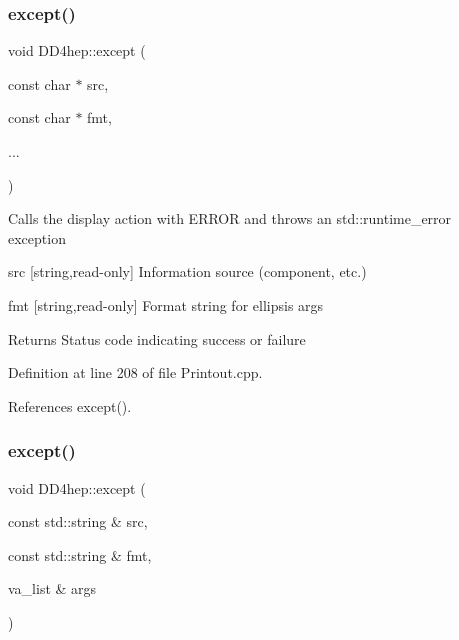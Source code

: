 \hypertarget{namespace_d_d4hep_a7fe7772a289c1e2eb3587ea99900827b}{}\label{namespace_d_d4hep_a7fe7772a289c1e2eb3587ea99900827b} 
\subsubsection{\texorpdfstring{except()}{except()}\hspace{0.1cm}{\footnotesize\ttfamily [2/4]}}
{\footnotesize\ttfamily void D\+D4hep\+::except (\begin{DoxyParamCaption}\item[{const char $\ast$}]{src,  }\item[{const char $\ast$}]{fmt,  }\item[{}]{... }\end{DoxyParamCaption})}

Calls the display action with E\+R\+R\+OR and throws an std\+::runtime\+\_\+error exception \begin{DoxyItemize}
\item src \mbox{[}string,read-\/only\mbox{]} Information source (component, etc.) \item fmt \mbox{[}string,read-\/only\mbox{]} Format string for ellipsis args \begin{DoxyReturn}{Returns}
Status code indicating success or failure 
\end{DoxyReturn}
\end{DoxyItemize}


Definition at line 208 of file Printout.\+cpp.



References except().

\hypertarget{namespace_d_d4hep_a4a02ec0c7a458f972986c141672a044c}{}\label{namespace_d_d4hep_a4a02ec0c7a458f972986c141672a044c} 
\subsubsection{\texorpdfstring{except()}{except()}\hspace{0.1cm}{\footnotesize\ttfamily [3/4]}}
{\footnotesize\ttfamily void D\+D4hep\+::except (\begin{DoxyParamCaption}\item[{const std\+::string \&}]{src,  }\item[{const std\+::string \&}]{fmt,  }\item[{va\+\_\+list \&}]{args }\end{DoxyParamCaption})}

